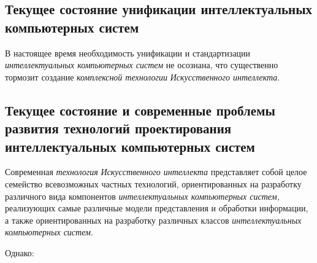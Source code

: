 \subsection{Текущее состояние унификации интеллектуальных компьютерных систем}
\label{subsec_current_state_unification_ICS}

В настоящее время необходимость унификации и стандартизации \textit{интеллектуальных компьютерных систем} не осознана, что существенно тормозит создание \textit{комплексной технологии} \textit{Искусственного интеллекта}.

\subsection{Текущее состояние и современные проблемы развития технологий проектирования интеллектуальных компьютерных систем}
\label{subsec_current_state_and_modern_problems_development_technology_designing_ICS}

Современная \textit{технология} \textit{Искусственного интеллекта} представляет собой целое семейство всевозможных частных технологий, ориентированных на разработку различного вида компонентов \textit{интеллектуальных компьютерных систем,} реализующих самые различные модели представления и обработки информации, а также ориентированных на разработку различных классов \textit{интеллектуальных компьютерных систем}.

Однако:

